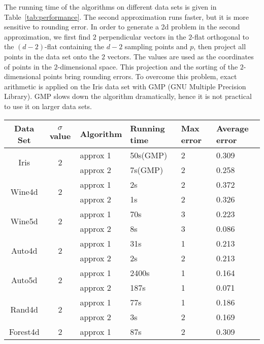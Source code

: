 \documentclass[preprint, 12pt]{elsarticle}
\begin{document}
The running time of the algorithms on different data sets is given in Table~\ref{tab:performance}. The second approximation runs faster, but it is more sensitive to rounding error. In order to generate a 2d problem in the second approximation, we first find $2$ perpendicular vectors in the $2$-flat orthogonal to the $(d-2)$-flat containing the $d-2$ sampling points and $p$, then project all points in the data set onto the $2$ vectors. The values are used as the coordinates of points in the $2$-dimensional space. This projection and the sorting of the $2$-dimensional points bring rounding errors. To overcome this problem, exact arithmetic is applied on the Iris data set with GMP (GNU Multiple Precision Library). GMP slows down the algorithm dramatically, hence it is not practical to use it on larger data sets.
\begin{table}[!htb]
  \centering
  \begin{threeparttable}[b]
    \begin{tabular}[center]{|c|c|l|l|l|l|}
      \hline
      Data Set & $\sigma$ value & Algorithm & Running time & Max error\tnote{1} & Average error\tnote{1} \\
      \hline
      \multirow{2}{*}{Iris} & \multirow{2}{*}{2} & approx 1  & 50s(GMP) & 2 & 0.309 \\
      & & approx 2 & 7s(GMP) & 2 & 0.258 \\
      \hline
      \multirow{2}{*}{Wine4d} & \multirow{2}{*}{2} & approx 1 & 2s & 2 & 0.372 \\
      & & approx 2 & 1s & 2 & 0.326 \\
      \hline
      \multirow{2}{*}{Wine5d} & \multirow{2}{*}{2} & approx 1 & 70s & 3 & 0.223 \\
      & & approx 2 & 8s & 3 & 0.086 \\
      \hline
      \multirow{2}{*}{Auto4d} & \multirow{2}{*}{2} & approx 1 & 31s & 1 & 0.213 \\
      & & approx 2 & 2s & 2 & 0.213 \\
      \hline
      \multirow{2}{*}{Auto5d} & \multirow{2}{*}{2} & approx 1 & 2400s & 1 & 0.164 \\
      & & approx 2 & 187s & 1 & 0.071 \\
      \hline
      \multirow{2}{*}{Rand4d} & \multirow{2}{*}{2} & approx 1 & 77s & 1 & 0.186 \\
      & & approx 2 & 3s & 2 & 0.169 \\
      \hline
      \multirow{2}{*}{Forest4d} & \multirow{2}{*}{2} & approx 1 & 87s & 2 & 0.309 \\

\end{tabular}
\end{threeparttable}
\end{table}
\end{document}
